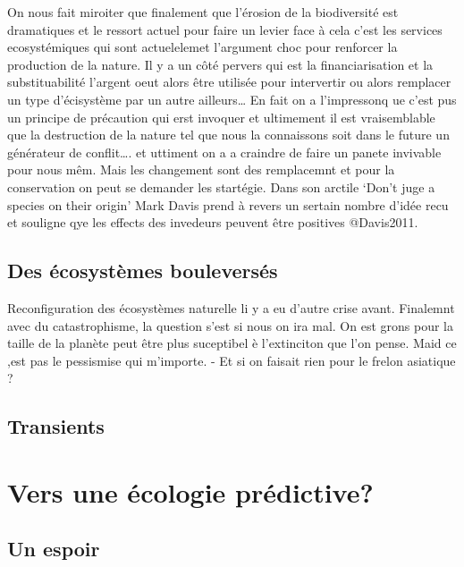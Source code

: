 On nous fait miroiter que finalement que l'érosion de la biodiversité
est dramatiques et le ressort actuel pour faire un levier face à cela
c'est les services ecosystémiques qui sont actuelelemet l'argument choc
pour renforcer la production de la nature. Il y a un côté pervers qui
est la financiarisation et la substituabilité l'argent oeut alors être
utilisée pour intervertir ou alors remplacer un type d'écisystème par un
autre ailleurs\ldots{} En fait on a l'impressonq ue c'est pus un
principe de précaution qui erst invoquer et ultimement il est
vraisemblable que la destruction de la nature tel que nous la
connaissons soit dans le future un générateur de conflit\ldots{}. et
uttiment on a a craindre de faire un panete invivable pour nous mêm.
Mais les changement sont des remplacemnt et pour la conservation on peut
se demander les startégie. Dans son arctile `Don't juge a species on
their origin' Mark Davis prend à revers un sertain nombre d'idée recu et
souligne qye les effects des invedeurs peuvent être positives
@Davis2011.

\subsection*{Des écosystèmes
bouleversés}\label{des-uxe9cosystuxe8mes-bouleversuxe9s}

Reconfiguration des écosystèmes naturelle li y a eu d'autre crise avant.
Finalemnt avec du catastrophisme, la question s'est si nous on ira mal.
On est grons pour la taille de la planète peut être plus suceptibel è
l'extinciton que l'on pense. Maid ce ,est pas le pessismise qui
m'importe. - Et si on faisait rien pour le frelon asiatique ?

\subsection*{Transients}\label{transients}

\section*{Vers une écologie
prédictive?}\label{vers-une-uxe9cologie-pruxe9dictive}

\subsection*{Un espoir}\label{un-espoir}

